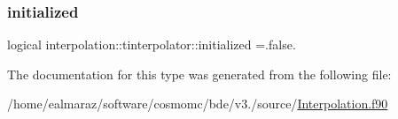 \subsubsection{\texorpdfstring{initialized}{initialized}}
{\footnotesize\ttfamily logical interpolation\+::tinterpolator\+::initialized =.false.}



The documentation for this type was generated from the following file\+:\begin{DoxyCompactItemize}
\item 
/home/ealmaraz/software/cosmomc/bde/v3./source/\mbox{\hyperlink{Interpolation_8f90}{Interpolation.\+f90}}\end{DoxyCompactItemize}
